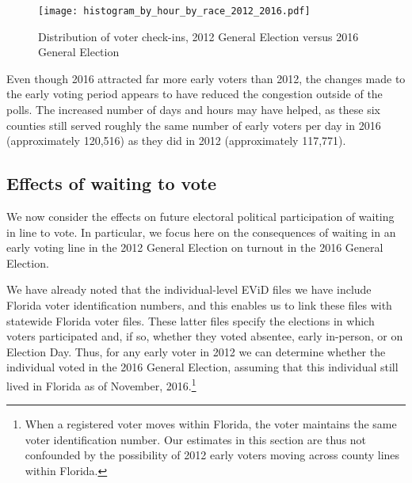 \documentclass[12pt,titlepage]{article}
\begin{document}
\begin{figure}[!ht]
  \caption{Distribution of voter check-ins, 2012 General Election versus 2016 General Election}
  \label{fig:race2012and2016}
  \centering
  \centering\texttt{[image: histogram\_by\_hour\_by\_race\_2012\_2016.pdf]}
\end{figure}

Even though 2016 attracted far more early voters than 2012, the
changes made to the early voting period appears to have reduced the
congestion outside of the polls. The increased number of days and
hours may have helped, as these six counties still served roughly the
same number of early voters per day in 2016 (approximately 120,516) as
they did in 2012 (approximately 117,771). 





\subsection*{Effects of waiting to vote}

We now consider the effects on future electoral political
participation of waiting in line to vote.  In particular, we focus
here on the consequences of waiting in an early voting line in the
2012 General Election on turnout in the 2016 General Election.

We have already noted that the individual-level EViD files we have
include Florida voter identification numbers, and this enables us to
link these files with statewide Florida voter files.  These latter
files specify the elections in which voters participated and, if so,
whether they voted absentee, early in-person, or on Election Day.
Thus, for any early voter in 2012 we can determine whether the
individual voted in the 2016 General Election, assuming that this
individual still lived in Florida as of November, 2016.\footnote{When
  a registered voter moves within Florida, the voter maintains the
  same voter identification number.  Our estimates in this section are
  thus not confounded by the possibility of 2012 early voters moving
  across county lines within Florida.}
\end{document}
